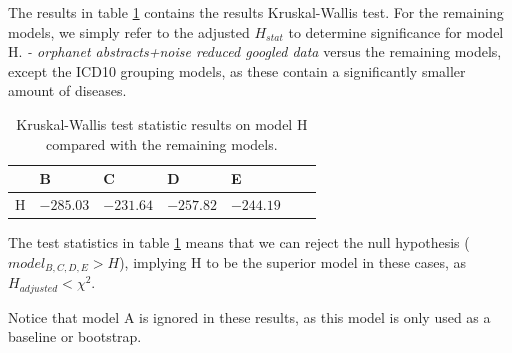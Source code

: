 \documentclass[10pt,letterpaper,two column,final]{article}
\begin{document}
The results in table \ref{tab:H_vs_rest} contains the results
Kruskal-Wallis test. For the remaining models, we simply refer to the
adjusted $H_{stat}$ to determine significance for model H. \textit{- orphanet
abstracts+noise reduced googled data} versus the remaining models,
except the ICD10 grouping models, as these contain a significantly
smaller amount of diseases.

\begin{table}
\begin{center}
	\begin{tabular}{lllllll}
		  & B &  C &  D &  E \\ \hline
		H & $-285.03$ & $-231.64$ & $-257.82$ & $-244.19$ \\
	\end{tabular}
	\caption{Kruskal-Wallis test statistic results on model H compared
	with the remaining models.}
	\label{tab:H_vs_rest}
\end{center}
\end{table}
The test statistics in table \ref{tab:H_vs_rest} means that we can
reject the null hypothesis ($model_{B,C,D,E} > H$), implying H to be the
superior model in these cases, as $H_{adjusted} < \chi^2$.

Notice that model A is ignored in these results, as this model is only
used as a baseline or bootstrap.


\end{document}
